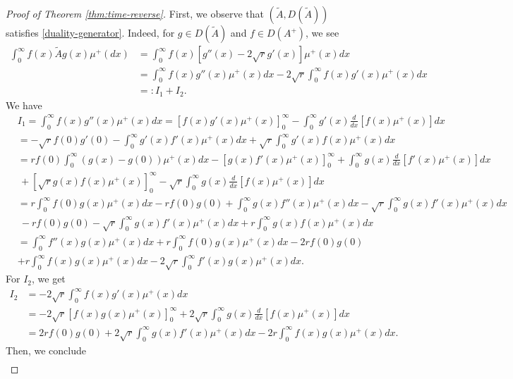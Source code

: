 \documentclass[11pt,a4paper]{article}
\theoremstyle{definition}
\theoremstyle{remark}
\begin{document}
	\begin{proof}[Proof of Theorem \ref{thm:time-reverse}]
		First, we observe that \((\widetilde{A}, {D}(\widetilde{A}))\) satisfies \eqref{duality-generator}. Indeed, for \(g \in {D}(\widetilde{A})\) and \(f \in {D}(A^+)\), we see
		\begin{align*}
			\int_0^\infty f(x) \widetilde{A}g(x) \mu^+(dx) &= \int_0^\infty f(x) [g''(x) - 2 \sqrt{r} g'(x)] \mu^+(x)dx\\
			&=\int_0^\infty f(x) g''(x) \mu^+(x) dx - 2 \sqrt{r} \int_0^\infty f(x) g'(x) \mu^+(x) dx\\
			&=: I_1 + I_2.
		\end{align*}
		We have
		\begin{align*}
			&I_1= \int_0^\infty f(x) g''(x) \mu^+(x) dx = [f(x) g'(x) \mu^+(x)]^\infty_0-\int_0^\infty g'(x) \frac{d}{dx} [f(x) \mu^+(x)] dx\\
			&=-\sqrt{r} f(0) g'(0) - \int_{0}^{\infty} g'(x) f'(x) \mu^+(x) dx + \sqrt{r} \int_0^\infty g'(x) f(x) \mu^+(x) dx\\
			&=r f(0) \int_0^\infty (g(x) - g(0))\mu^+(x) dx - [g(x) f'(x) \mu^+(x)]^\infty_0 + \int_0^\infty g(x) \frac{d}{dx} [f'(x)\mu^+(x)] dx\\
			& \, + [\sqrt{r} g(x) f(x)\mu^+(x)]^\infty_0- \sqrt{r} \int_0^\infty g(x) \frac{d}{dx} [f(x) \mu^+(x)] dx\\
			&=r \int_0^\infty f(0) g(x) \mu^+(x) dx - r f(0) g(0) + \int_0^\infty g(x) f''(x) \mu^+(x) dx - \sqrt{r} \int_0^\infty g(x) f'(x) \mu^+(x) dx\\
			& \ - rf(0) g(0) - \sqrt{r}\int_0^\infty g(x) f'(x) \mu^+(x) dx + r \int_0^\infty g(x) f(x) \mu^+(x) dx\\
			&=\int_0^\infty f''(x) g(x) \mu^+(x) dx + r \int_0^\infty f(0) g(x) \mu^+(x) dx - 2 r f(0) g(0)\\
			&+ r \int_0^\infty f(x) g(x) \mu^+(x) dx - 2 \sqrt{r} \int_0^\infty f'(x) g(x) \mu^+(x) dx.
		\end{align*}
		For $I_2$, we get
		\begin{align*}
			I_2&=-2 \sqrt{r} \int_0^\infty f(x) g'(x) \mu^+(x) dx\\
			&=-2 \sqrt{r} [f(x) g(x) \mu^+(x)]^\infty_0 + 2 \sqrt{r}\int_0^\infty g(x) \frac{d}{dx}[f(x) \mu^+(x)] dx\\
			&= 2 r f(0) g(0) + 2 \sqrt{r} \int_0^\infty g(x) f'(x) \mu^+(x) dx - 2r\int_0^\infty f(x) g(x) \mu^+(x) dx.
		\end{align*}
		Then, we conclude
		\begin{align*}

\end{align*}
\end{proof}
\end{document}
